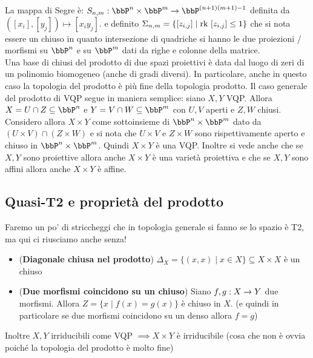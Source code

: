 \documentclass[a4paper,NoNotes,GeneralMath]{stdmdoc}
\begin{document}
	La mappa di Segre è: $S_{n,m}: \bbP^n \times \bbP^m \rar \bbP^{(n+1)(m+1)-1}$ definita da $([x_i],[y_j]) \mapsto [x_iy_j]$. e definito $\Sigma_{n,m} = \{ [z_{i,j}] \mid \mbox{rk } [z_{i,j}] \le 1 \}$ che si nota essere un chiuso in quanto intersezione di quadriche si hanno le due proiezioni / morfismi su $\bbP^n$ e su $\bbP^m$ dati da righe e colonne della matrice. \\
	Una base di chiusi del prodotto di due spazi proiettivi è data dal luogo di zeri di un polinomio biomogeneo (anche di gradi diversi). In particolare, anche in questo caso la topologia del prodotto è più fine della topologia prodotto.
	\vskip 0.8cm
	Il caso generale del prodotto di VQP segue in maniera semplice: siano $X, Y$ VQP. Allora $X = U\cap Z \subseteq \bbP^n$ e $Y = V \cap W \subseteq \bbP^m$ con $U,V$ aperti e $Z,W$ chiusi. Considero allora $X \times Y$ come sottoinsieme di $\bbP^n \times \bbP^m$ dato da $(U \times V) \cap (Z \times W)$ e si nota che $U \times V$ e $Z \times W$ sono rispettivamente aperto e chiuso in $\bbP^n \times \bbP^m$. Quindi $X \times Y$ è una VQP. Inoltre si vede anche che se $X, Y$ sono proiettive allora anche $X \times Y$ è una varietà proiettiva e che se $X,Y$ sono affini allora anche $X \times Y$ è affine.
	
	\subsection*{Quasi-T2 e proprietà del prodotto}
	Faremo un po' di striccheggi che in topologia generale si fanno se lo spazio è T2, ma qui ci riusciamo anche senza!
	\begin{itemize}
		\item ({\bf Diagonale chiusa nel prodotto}) $\Delta_X = \{ (x, x) \mid x \in X \} \subseteq X \times X$ è un chiuso
		\item ({\bf Due morfismi coincidono su un chiuso}) Siano $f,g: X \rightarrow Y$ due morfismi. Allora $Z = \{ x \mid f(x) = g(x) \}$ è chiuso in $X$. (e quindi in particolare se due morfismi coincidono su un denso allora $f=g$)
	\end{itemize}
	Inoltre $X, Y$ irriducibili come VQP $\implies X \times Y$ è irriducibile (cosa che non è ovvia poiché la topologia del prodotto è molto fine)
	
\end{document}

